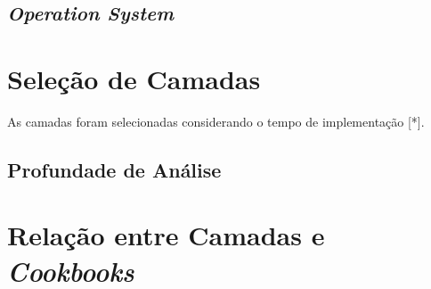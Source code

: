 
\subsection{\textit{Operation System}}
\label{sec:cam-os}

\section{Seleção de Camadas}
\label{sec:sel-cam}

As camadas foram selecionadas considerando o tempo de implementação [*].

\subsection{Profundade de Análise}

\section{Relação entre Camadas e \textit{Cookbooks}}
